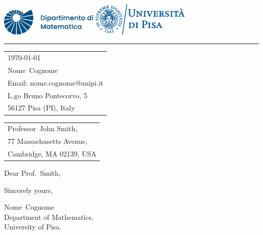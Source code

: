 \documentclass{article}
\makeatletter
\newcommand{\nome}{Nome}
\newcommand{\cognome}{Cognome}
\newcommand{\email}{nome.cognome@unipi.it}
\makeatother
\begin{document}

\includegraphics[width=0.35\textwidth]{matematica-dx-blu.eps}
\hfill 
\includegraphics[width=0.35\textwidth]{marchio_unipi_orizz_pant541.eps}

\vspace{-1em} %

\rule{\linewidth}{.5pt} %

\bigskip\bigskip %


\hfill
\begin{tabular}{l @{}}
\hfill \today \bigskip\\ %
\hfill \nome\ \cognome \\
\hfill Email: \email \\
\hfill L.go Bruno Pontecorvo, 5 \\
\hfill 56127 Pisa (PI), Italy \\
\end{tabular}

\bigskip %


\begin{tabular}{@{} l}
	Professor\ John Smith, \\
	77 Massachusetts Avenue, \\
    Cambridge, MA 02139, USA
\end{tabular}

\bigskip

Dear Prof.\ Smith,

\bigskip


\lipsum[1-2]

\bigskip %

Sincerely yours,

\vspace{20pt} %

\nome\ \cognome\\ 
Department of Mathematics, \\
University of Pisa. 
\end{document}
